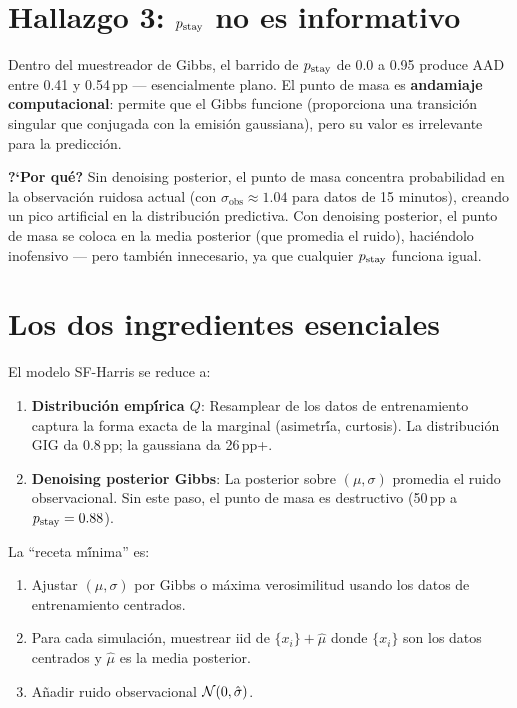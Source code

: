 \section{Hallazgo 3: $p_{\text{stay}}$ no es informativo}

Dentro del muestreador de Gibbs, el barrido de $p_{\text{stay}}$ de 0.0 a 0.95 produce
AAD entre 0.41 y 0.54\,pp --- esencialmente plano. El punto de masa es
\textbf{andamiaje computacional}: permite que el Gibbs funcione (proporciona una
transici\'{o}n singular que conjugada con la emisi\'{o}n gaussiana), pero su valor
es irrelevante para la predicci\'{o}n.

\textbf{?`Por qu\'{e}?} Sin denoising posterior, el punto de masa concentra
probabilidad en la observaci\'{o}n ruidosa actual (con $\sigma_{\text{obs}} \approx 1.04$
para datos de 15 minutos), creando un pico artificial en la distribuci\'{o}n
predictiva. Con denoising posterior, el punto de masa se coloca en la media posterior
(que promedia el ruido), haci\'{e}ndolo inofensivo --- pero tambi\'{e}n innecesario,
ya que cualquier $p_{\text{stay}}$ funciona igual.

\section{Los dos ingredientes esenciales}

El modelo SF-Harris se reduce a:

\begin{enumerate}
    \item \textbf{Distribuci\'{o}n emp\'{\'i}rica $Q$}: Resamplear de los datos de
          entrenamiento captura la forma exacta de la marginal (asimetr\'{\'i}a, curtosis).
          La distribuci\'{o}n GIG da 0.8\,pp; la gaussiana da 26\,pp+.

    \item \textbf{Denoising posterior Gibbs}: La posterior sobre $(\mu, \sigma)$
          promedia el ruido observacional. Sin este paso, el punto de masa es
          destructivo (50\,pp a $p_{\text{stay}} = 0.88$).
\end{enumerate}

La ``receta m\'{\'i}nima'' es:
\begin{enumerate}
    \item Ajustar $(\mu, \sigma)$ por Gibbs o m\'{a}xima verosimilitud usando los datos
          de entrenamiento centrados.
    \item Para cada simulaci\'{o}n, muestrear iid de $\{x_i\} + \hat{\mu}$ donde
          $\{x_i\}$ son los datos centrados y $\hat{\mu}$ es la media posterior.
    \item A\~{n}adir ruido observacional $\mathcal{N}(0, \hat{\sigma})$.
\end{enumerate}

